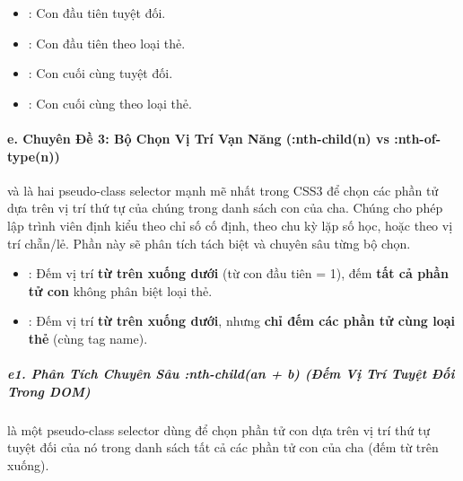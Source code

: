 \begin{tipBox}
\begin{itemize}[leftmargin=1.5em, itemsep=3pt, parsep=0pt]
    \item {}: Con đầu tiên tuyệt đối.
    \item {}: Con đầu tiên theo loại thẻ.
    \item {}: Con cuối cùng tuyệt đối.
    \item {}: Con cuối cùng theo loại thẻ.
\end{itemize}
\end{tipBox}

\paragraph{e. Chuyên Đề 3: Bộ Chọn Vị Trí Vạn Năng (:nth-child(n) vs :nth-of-type(n))}

 và  là hai pseudo-class selector mạnh mẽ nhất trong CSS3 để chọn các phần tử dựa trên vị trí thứ tự của chúng trong danh sách con của cha. Chúng cho phép lập trình viên định kiểu theo chỉ số cố định, theo chu kỳ lặp số học, hoặc theo vị trí chẵn/lẻ. Phần này sẽ phân tích tách biệt và chuyên sâu từng bộ chọn.

\begin{conceptBox}
\begin{itemize}[leftmargin=1.5em, itemsep=3pt, parsep=0pt]
    \item {}: Đếm vị trí \textbf{từ trên xuống dưới} (từ con đầu tiên = 1), đếm \textbf{tất cả phần tử con} không phân biệt loại thẻ.
    \item {}: Đếm vị trí \textbf{từ trên xuống dưới}, nhưng \textbf{chỉ đếm các phần tử cùng loại thẻ} (cùng tag name).
\end{itemize}
\end{conceptBox}


\subparagraph{e1. Phân Tích Chuyên Sâu :nth-child(an + b) (Đếm Vị Trí Tuyệt Đối Trong DOM)}

 là một pseudo-class selector dùng để chọn phần tử con dựa trên vị trí thứ tự tuyệt đối của nó trong danh sách tất cả các phần tử con của cha (đếm từ trên xuống).

